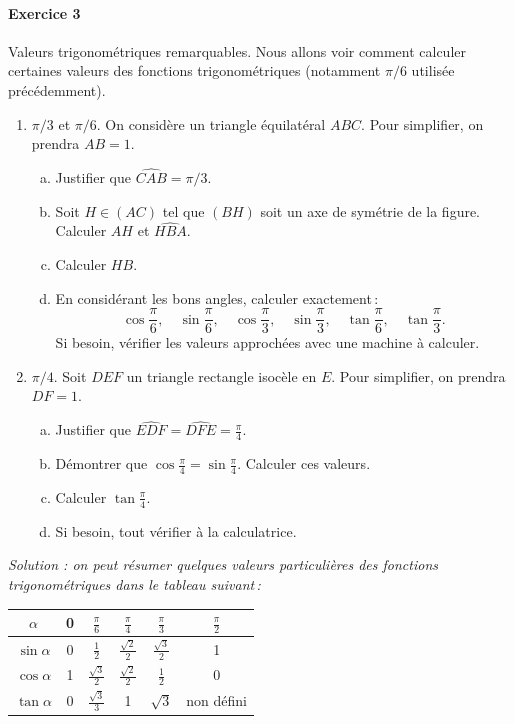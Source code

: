		\paragraph{Exercice 3} Valeurs trigonométriques remarquables.
			Nous allons voir comment calculer certaines valeurs des fonctions trigonométriques (notamment $\pi/6$ utilisée précédemment).
			\begin{enumerate}[1)]
				\item $\pi/3$ et $\pi/6$. On considère un triangle équilatéral $ABC$. Pour simplifier, on prendra $AB=1$.
				\begin{enumerate}[a)]
					\item Justifier que $\widehat{CAB}=\pi/3$.
					\item Soit $H\in(AC)$ tel que $(BH)$ soit un axe de symétrie de la figure. Calculer $AH$ et $\widehat{HBA}$.
					\item Calculer $HB$.
					\item En considérant les bons angles, calculer exactement\,:
					\begin{equation}
						\cos{\frac{\pi}{6}},\quad \sin\frac{\pi}{6},\quad \cos{\frac{\pi}{3}},\quad \sin\frac{\pi}{3},\quad \tan{\frac{\pi}{6}},\quad \tan\frac{\pi}{3}.\nonumber
					\end{equation}
					Si besoin, vérifier les valeurs approchées avec une machine à calculer.
				\end{enumerate}
				\item $\pi/4$. Soit $DEF$ un triangle rectangle isocèle en $E$. Pour simplifier, on prendra $DF=1$.
				\begin{enumerate}[a)]
					\item Justifier que $\widehat{EDF}=\widehat{DFE}=\frac{\pi}{4}$.
					\item Démontrer que $\cos\frac{\pi}{4}=\sin\frac{\pi}{4}$. Calculer ces valeurs.
					\item Calculer $\tan\frac{\pi}{4}$.
					\item Si besoin, tout vérifier à la calculatrice.
				\end{enumerate}
			\end{enumerate}

			\emph{Solution : on peut résumer quelques valeurs particulières des fonctions trigonométriques dans le tableau suivant\,:}

			\renewcommand*{\arraystretch}{1.4}
			\begin{tabular}{cccccc}
				$\alpha$     & 0 & $\frac{\pi}{6}$     & $\frac{\pi}{4}$      & $\frac{\pi}{3}$      & $\frac{\pi}{2}$ \\
				\hline
				$\sin\alpha$ & 0 & $\frac{1}{2}$       & $\frac{\sqrt{2}}{2}$ & $\frac{\sqrt{3}}{2}$ & 1 \\
				$\cos\alpha$ & 1 & $\frac{\sqrt{3}}{2}$& $\frac{\sqrt{2}}{2}$ & $\frac{1}{2}$        & 0 \\
				$\tan\alpha$ & 0 & $\frac{\sqrt{3}}{3}$& 1                    & $\sqrt{3}$           & non défini
			\end{tabular}

